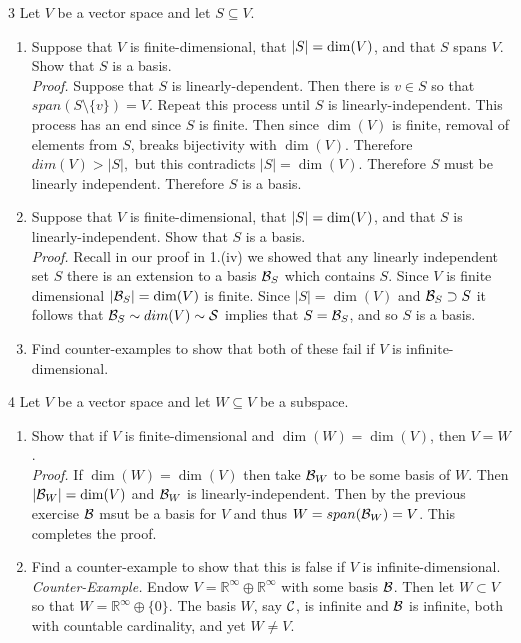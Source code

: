 \documentclass{exercises}
\begin{document}
\begin{exr}{}{3}
	Let $V$ be a vector space and let $S\subseteq V$.
	\begin{enumerate}
		\item Suppose that $V$ is finite-dimensional, that $\lvert S\rvert=\dim (V)$, and that $S$ spans $V$.  Show that $S$ is a basis. \\
		\emph{Proof.} Suppose that $S$ is linearly-dependent. Then there is $v \in S$ so that $span(S \setminus \{v\}) = V$. Repeat this process until $S$ is linearly-independent. This process has an end since $S$ is finite. Then since $\dim (V)$ is finite, removal of elements from $S$, breaks bijectivity with $\dim (V)$. Therefore $dim(V) > |S|,$ but this contradicts $|S| = \dim(V).$ Therefore $S$ must be linearly independent. Therefore $S$ is a basis.

		\item Suppose that $V$ is finite-dimensional, that $\lvert S\rvert=\dim (V)$, and that $S$ is linearly-independent.  Show that $S$ is a basis. \\


		\emph{Proof.} Recall in our proof in 1.(iv) we showed that any linearly independent set $S$ there is an extension to a basis $\scriptb_S$ which contains $S$. Since $V$ is finite dimensional $|\scriptb_S| = \dim(V)$ is finite.  Since $|S| = \dim(V)$ and $\scriptb_S \supset S$ it follows that $\scriptb_S \sim dim(V) \sim \scripts$ implies that $S = \scriptb_S$, and so $S$ is a basis.
		\item Find counter-examples to show that both of these fail if $V$ is infinite-dimensional.
	\end{enumerate}
\end{exr}

\begin{exr}{}{4}
	Let $V$ be a vector space and let $W\subseteq V$ be a subspace.
	\begin{enumerate}
		\item Show that if $V$ is finite-dimensional and $\dim (W)=\dim (V)$, then $V=W$. \\

		\emph{Proof.} If $\dim(W) = \dim(V)$ then take $\scriptb_W$ to be some basis of $W$. Then $|\scriptb_W| = \dim(V)$ and $\scriptb_W$ is linearly-independent. Then by the previous exercise $\scriptb$ msut be a basis for $V$ and thus $W = span(\scriptb_W) = V$. This completes the proof.


		\item Find a counter-example to show that this is false if $V$ is infinite-dimensional. \\

		\emph{Counter-Example.} Endow $V = \mathbb{R}^\infty \oplus \mathbb{R}^\infty$ with some basis $\scriptb$. Then let $W \subset V$ so that $W = \mathbb{R}^\infty \oplus \{0\}.$ The basis $W$, say $\scriptc$, is infinite and $\scriptb$ is infinite, both with countable cardinality, and yet $W \neq V$.
	\end{enumerate}
\end{exr}
\end{document}
